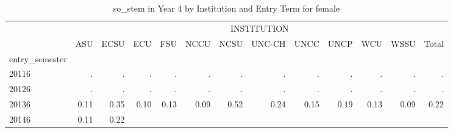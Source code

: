 \begin{table}[!h]
\caption{so\_stem in Year 4 by Institution and Entry Term for female}
\centering
\begin{tabular}{lllllllllllll}
\cline{1-13}
\multicolumn{1}{c}{} &
  \multicolumn{12}{|c}{INSTITUTION} \\
\multicolumn{1}{c}{} &
  \multicolumn{1}{|r}{ASU} &
  \multicolumn{1}{r}{ECSU} &
  \multicolumn{1}{r}{ECU} &
  \multicolumn{1}{r}{FSU} &
  \multicolumn{1}{r}{NCCU} &
  \multicolumn{1}{r}{NCSU} &
  \multicolumn{1}{r}{UNC-CH} &
  \multicolumn{1}{r}{UNCC} &
  \multicolumn{1}{r}{UNCP} &
  \multicolumn{1}{r}{WCU} &
  \multicolumn{1}{r}{WSSU} &
  \multicolumn{1}{r}{Total} \\
\cline{1-13}
\multicolumn{1}{l}{entry\_semester} &
  \multicolumn{1}{|r}{} &
  \multicolumn{1}{r}{} &
  \multicolumn{1}{r}{} &
  \multicolumn{1}{r}{} &
  \multicolumn{1}{r}{} &
  \multicolumn{1}{r}{} &
  \multicolumn{1}{r}{} &
  \multicolumn{1}{r}{} &
  \multicolumn{1}{r}{} &
  \multicolumn{1}{r}{} &
  \multicolumn{1}{r}{} &
  \multicolumn{1}{r}{} \\
\multicolumn{1}{l}{\hspace{1em}20116} &
  \multicolumn{1}{|r}{.} &
  \multicolumn{1}{r}{.} &
  \multicolumn{1}{r}{.} &
  \multicolumn{1}{r}{.} &
  \multicolumn{1}{r}{.} &
  \multicolumn{1}{r}{.} &
  \multicolumn{1}{r}{.} &
  \multicolumn{1}{r}{.} &
  \multicolumn{1}{r}{.} &
  \multicolumn{1}{r}{.} &
  \multicolumn{1}{r}{.} &
  \multicolumn{1}{r}{.} \\
\multicolumn{1}{l}{\hspace{1em}20126} &
  \multicolumn{1}{|r}{.} &
  \multicolumn{1}{r}{.} &
  \multicolumn{1}{r}{.} &
  \multicolumn{1}{r}{.} &
  \multicolumn{1}{r}{.} &
  \multicolumn{1}{r}{.} &
  \multicolumn{1}{r}{.} &
  \multicolumn{1}{r}{.} &
  \multicolumn{1}{r}{.} &
  \multicolumn{1}{r}{.} &
  \multicolumn{1}{r}{.} &
  \multicolumn{1}{r}{.} \\
\multicolumn{1}{l}{\hspace{1em}20136} &
  \multicolumn{1}{|r}{0.11} &
  \multicolumn{1}{r}{0.35} &
  \multicolumn{1}{r}{0.10} &
  \multicolumn{1}{r}{0.13} &
  \multicolumn{1}{r}{0.09} &
  \multicolumn{1}{r}{0.52} &
  \multicolumn{1}{r}{0.24} &
  \multicolumn{1}{r}{0.15} &
  \multicolumn{1}{r}{0.19} &
  \multicolumn{1}{r}{0.13} &
  \multicolumn{1}{r}{0.09} &
  \multicolumn{1}{r}{0.22} \\
\multicolumn{1}{l}{\hspace{1em}20146} &
  \multicolumn{1}{|r}{0.11} &
  \multicolumn{1}{r}{0.22} &

\end{tabular}
\end{table}

